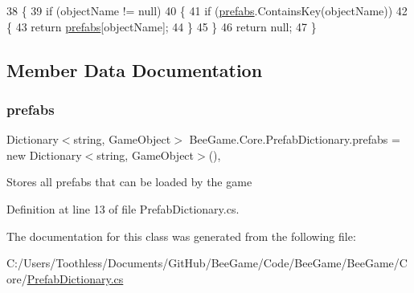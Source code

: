 \begin{DoxyCode}
38         \{
39             \textcolor{keywordflow}{if} (objectName != null)
40             \{
41                 \textcolor{keywordflow}{if} (\hyperlink{class_bee_game_1_1_core_1_1_prefab_dictionary_a209d61a11be378eab228e65b439e485f}{prefabs}.ContainsKey(objectName))
42                 \{
43                     \textcolor{keywordflow}{return} \hyperlink{class_bee_game_1_1_core_1_1_prefab_dictionary_a209d61a11be378eab228e65b439e485f}{prefabs}[objectName];
44                 \}
45             \}
46             \textcolor{keywordflow}{return} null;
47         \}
\end{DoxyCode}


\subsection{Member Data Documentation}
\mbox{\label{class_bee_game_1_1_core_1_1_prefab_dictionary_a209d61a11be378eab228e65b439e485f}} 
\subsubsection{\texorpdfstring{prefabs}{prefabs}}
{\footnotesize\ttfamily Dictionary$<$string, Game\+Object$>$ Bee\+Game.\+Core.\+Prefab\+Dictionary.\+prefabs = new Dictionary$<$string, Game\+Object$>$()\hspace{0.3cm}{\ttfamily [static]}, {\ttfamily [private]}}



Stores all prefabs that can be loaded by the game 



Definition at line 13 of file Prefab\+Dictionary.\+cs.



The documentation for this class was generated from the following file\+:\begin{DoxyCompactItemize}
\item 
C\+:/\+Users/\+Toothless/\+Documents/\+Git\+Hub/\+Bee\+Game/\+Code/\+Bee\+Game/\+Bee\+Game/\+Core/\hyperlink{_prefab_dictionary_8cs}{Prefab\+Dictionary.\+cs}\end{DoxyCompactItemize}
